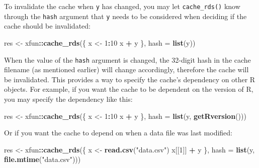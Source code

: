 \documentclass[
  11pt,
]{krantz}
\newenvironment{Shaded}{\begin{snugshade}}{\end{snugshade}}
\newcommand{\DataTypeTok}[1]{\textcolor[rgb]{0.27,0.27,0.27}{#1}}
\newcommand{\DecValTok}[1]{\textcolor[rgb]{0.06,0.06,0.06}{#1}}
\newcommand{\KeywordTok}[1]{\textcolor[rgb]{0.27,0.27,0.27}{\textbf{#1}}}
\newcommand{\NormalTok}[1]{#1}
\newcommand{\OperatorTok}[1]{\textcolor[rgb]{0.43,0.43,0.43}{\textbf{#1}}}
\newcommand{\StringTok}[1]{\textcolor[rgb]{0.5,0.5,0.5}{#1}}
\begin{document}
To invalidate the cache when \texttt{y} has changed, you may let \texttt{cache\_rds()} know through the \texttt{hash} argument that \texttt{y} needs to be considered when deciding if the cache should be invalidated:

\begin{Shaded}
\begin{Highlighting}[]
\NormalTok{res <-}\StringTok{ }\NormalTok{xfun}\OperatorTok{::}\KeywordTok{cache_rds}\NormalTok{(\{}
\NormalTok{  x <-}\StringTok{ }\DecValTok{1}\OperatorTok{:}\DecValTok{10}
\NormalTok{  x }\OperatorTok{+}\StringTok{ }\NormalTok{y}
\NormalTok{\}, }\DataTypeTok{hash =} \KeywordTok{list}\NormalTok{(y))}
\end{Highlighting}
\end{Shaded}

When the value of the \texttt{hash} argument is changed, the 32-digit hash in the cache filename (as mentioned earlier) will change accordingly, therefore the cache will be invalidated. This provides a way to specify the cache's dependency on other R objects. For example, if you want the cache to be dependent on the version of R, you may specify the dependency like this:

\begin{Shaded}
\begin{Highlighting}[]
\NormalTok{res <-}\StringTok{ }\NormalTok{xfun}\OperatorTok{::}\KeywordTok{cache_rds}\NormalTok{(\{}
\NormalTok{  x <-}\StringTok{ }\DecValTok{1}\OperatorTok{:}\DecValTok{10}
\NormalTok{  x }\OperatorTok{+}\StringTok{ }\NormalTok{y}
\NormalTok{\}, }\DataTypeTok{hash =} \KeywordTok{list}\NormalTok{(y, }\KeywordTok{getRversion}\NormalTok{()))}
\end{Highlighting}
\end{Shaded}

Or if you want the cache to depend on when a data file was last modified:

\begin{Shaded}
\begin{Highlighting}[]
\NormalTok{res <-}\StringTok{ }\NormalTok{xfun}\OperatorTok{::}\KeywordTok{cache_rds}\NormalTok{(\{}
\NormalTok{  x <-}\StringTok{ }\KeywordTok{read.csv}\NormalTok{(}\StringTok{"data.csv"}\NormalTok{)}
\NormalTok{  x[[}\DecValTok{1}\NormalTok{]] }\OperatorTok{+}\StringTok{ }\NormalTok{y}
\NormalTok{\}, }\DataTypeTok{hash =} \KeywordTok{list}\NormalTok{(y, }\KeywordTok{file.mtime}\NormalTok{(}\StringTok{"data.csv"}\NormalTok{)))}
\end{Highlighting}
\end{Shaded}
\end{document}
